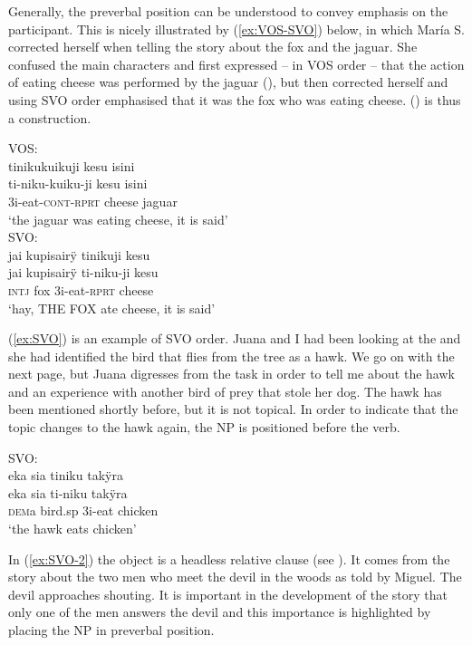 Generally, the preverbal position can be understood to convey emphasis on the participant. This is nicely illustrated by (\ref{ex:VOS-SVO}) below, in which María S. corrected herself when telling the story about the fox and the jaguar. She confused the main characters and first expressed – in VOS order – that the action of eating cheese was performed by the jaguar (), but then corrected herself and using SVO order emphasised that it was the fox who was eating cheese. () is thus a  construction.


\ea\label{ex:VOS-SVO}
  \ea\label{ex:VOS-SVO.1}
 \begingl 
\glpreamble  \textup{VOS:}\\tinikukuikuji kesu isini\\
\gla ti-niku-kuiku-ji kesu isini\\ 
\glb 3i-eat-\textsc{cont}-\textsc{rprt} cheese jaguar\\ 
\glft ‘the jaguar was eating cheese, it is said’\\ 
\endgl
  \ex\label{ex:VOS-SVO.2}
 \begingl
\glpreamble   \textup{SVO:}\\jai kupisairÿ tinikuji kesu\\
\gla  jai kupisairÿ ti-niku-ji kesu\\
\glb \textsc{intj} fox 3i-eat-\textsc{rprt} cheese\\
\glft ‘hay, THE FOX ate cheese, it is said’
\endgl
\trailingcitation{[rxx-n120511l-1.026-027]}
\z
\xe

(\ref{ex:SVO}) is an example of SVO order. Juana and I had been looking at the  and she had identified the bird that flies from the tree as a hawk. We go on with the next page, but Juana digresses from the task in order to tell me about the hawk and an experience with another bird of prey that stole her dog. The hawk has been mentioned shortly before, but it is not topical. In order to indicate that the topic changes to the hawk again, the NP is positioned before the verb.

\ea\label{ex:SVO}
\begingl 
\glpreamble  \textup{SVO:}\\eka sia tiniku takÿra\\
\gla eka sia ti-niku takÿra\\ 
\glb \textsc{dem}a bird.sp 3i-eat chicken\\ 
\glft ‘the hawk eats chicken’\\ 
\endgl
\trailingcitation{[jxx-a120516l-a.164]}
\xe

In (\ref{ex:SVO-2}) the object is a headless relative clause (see ). It comes from the story about the two men who meet the devil in the woods as told by Miguel. The devil approaches shouting. It is important in the development of the story that only one of the men answers the devil and this importance is highlighted by placing the NP in preverbal position.

